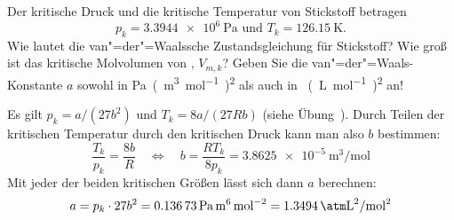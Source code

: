\documentclass[DIV11]{scrartcl}
\begin{document}
\begin{question}[name=Van-der-Waalssche Zustandsgleichung I,ID=vdW:1]
Der kritische Druck und die kritische Temperatur von Stickstoff betragen
\[p_k = \SI{3.3944e6}{\pascal} \text{ und } T_k = \SI{126.15}{\kelvin}.\]
Wie lautet die van"=der"=Waalssche Zustandsgleichung für Stickstoff?  Wie groß
ist das kritische Molvolumen von , $V_{m,k}$?  Geben Sie die
van"=der"=Waals-Konstante $a$ sowohl in
\si{\pascal(\metre\cubed\per\mole)\squared} als auch in
\si{\atm(\liter\per\mole)\squared} an!
\end{question}
\begin{solution}[name=Van-der-Waalssche Zustandsgleichung I]
  Es gilt $p_k = a/(27b^2)$ und $T_k = 8a/(27Rb)$ (siehe
  Übung~). Durch Teilen der kritischen Temperatur durch
  den kritischen Druck kann man also $b$ bestimmen:
  \[
    \frac{T_k}{p_k} = \frac{8b}{R}
    \quad\Leftrightarrow\quad
    b = \frac{RT_k}{8p_k}
      = \SI{3.8625e-5}{\metre\cubed\per\mole}
  \]
  Mit jeder der beiden kritischen Größen lässt sich dann $a$ berechnen:
  \[
    a = p_k \cdot 27b^2
      = \SI{0.13673}{\pascal\metre\tothe{6}\per\mole\squared}
      = \SI{1.3494}{\atm\square\liter\per\mole\squared}
  \]
\end{solution}
\end{document}
